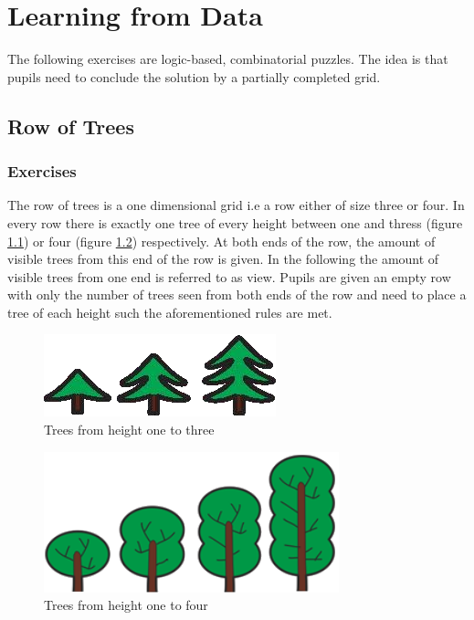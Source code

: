 \chapter{Learning from Data}
\label{chapter:learningFromData}

The following exercises are logic-based, combinatorial puzzles. The idea is that pupils need to conclude the solution by a partially completed grid.

\section{Row of Trees}
\label{section:treeRow}

\subsection{Exercises}
The row of trees is a one dimensional grid i.e a row either of size three or four. In every row there is exactly one tree of every height between one and thress (figure \ref{fig:trees_3}) or four (figure \ref{fig:trees_4}) respectively. At both ends of the row, the amount of visible trees from this end of the row is given. In the following the amount of visible trees from one end is referred to as view.
Pupils are given an empty row with only the number of trees seen from both ends of the row and need to place a tree of each height such the aforementioned rules are met.

\begin{figure} 
    \centering
    \includegraphics[width=0.4 \columnwidth]{figures/trees_3.png}
    \caption{Trees from height one to three} 
    \label{fig:trees_3} 
\end{figure}

\begin{figure} 
    \centering
    \includegraphics[width=0.4 \columnwidth]{figures/trees_4.png}
    \caption{Trees from height one to four} 
    \label{fig:trees_4} 
\end{figure}

